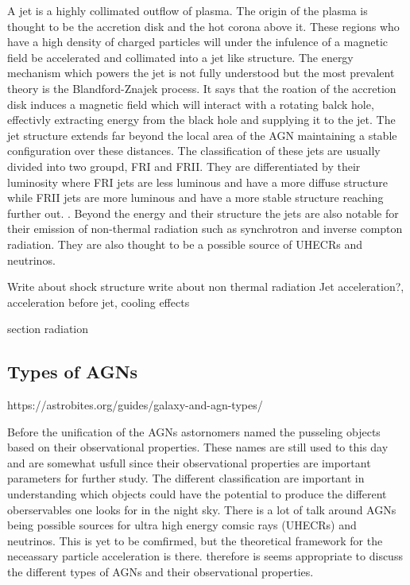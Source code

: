 \documentclass{article}
\begin{document}
A jet is a highly collimated outflow of plasma. The origin of the plasma is thought to be the accretion disk and the hot corona above it. These regions who have a high density of charged particles will  under the infulence of a magnetic field be accelerated and collimated into a jet like structure.
The energy mechanism which powers the jet is not fully understood but the most prevalent theory is the Blandford-Znajek process. It says that the roation of the accretion disk  induces a magnetic field which will interact with a rotating balck hole, effectivly extracting energy from the black hole and supplying it to the jet. 
The jet structure extends far beyond the local area of the AGN maintaining a stable configuration over these distances. The classification of these jets are usually divided into two groupd, FRI and FRII. They are differentiated by their luminosity where FRI jets are less luminous and have a more diffuse structure while FRII jets are more luminous and have a more stable structure reaching further out. \cite{walg2013relativistic}.
Beyond the energy and their structure the jets are also notable for their emission of non-thermal radiation such as synchrotron and inverse compton radiation. They are also thought to be a possible source of UHECRs and neutrinos.


Write about shock structure
write about non thermal radiation
Jet acceleration?, acceleration before jet, cooling effects



section radiation




\subsection{Types of AGNs}

https://astrobites.org/guides/galaxy-and-agn-types/

Before the unification of the AGNs astornomers named the pusseling objects based on their observational properties. These 
names are still used to this day and are somewhat usfull since their observational properties are important parameters for further study. 
The different classification are important in understanding which objects could have the potential to produce the different oberservables one 
looks for in the night sky. There is a lot of talk around AGNs being possible sources for ultra high energy comsic rays (UHECRs) and neutrinos.
This is yet to be comfirmed, but the theoretical framework for the neceassary particle acceleration is there. therefore is seems appropriate to
discuss the different types of AGNs and their observational properties.
\end{document}
